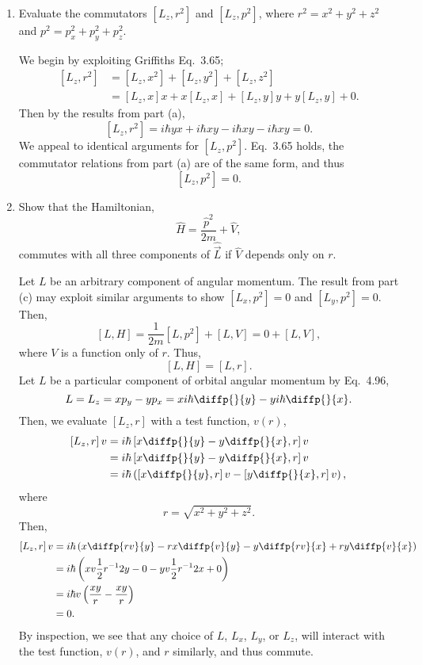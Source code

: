 \documentclass[a4paper, 12pt]{config/homework}
\begin{document}
\begin{enumerate}
\begin{enumerate}[label=(\alph*)]
\bigskip
\item Evaluate the commutators \([L_z, r^2]\) and \([L_z, p^2]\), where \(r^2 = x^2 + y^2 + z^2\) and \(p^2 = p^2_x + p^2_y + p^2_z\). \bigskip

We begin by exploiting Griffiths Eq.\ 3.65;
\begin{align*}
\left[L_z, r^2\right] &= \left[L_z, x^2\right] + \left[L_z, y^2\right] + \left[L_z, z^2\right]
\\&= \left[L_z, x\right]x + x\left[L_z, x\right] + \left[L_z, y\right]y + y\left[L_z, y\right] + 0.
\end{align*}
Then by the results from part (a),
\[\left[L_z, r^2\right] = i\hbar yx + i\hbar xy -i\hbar xy - i\hbar xy = 0.\]
We appeal to identical arguments for \(\left[L_z, p^2\right]\). Eq.\ 3.65 holds, the commutator relations from part (a) are of the same form, and thus
\[\left[L_z, p^2\right] = 0.\]

\bigskip
\item Show that the Hamiltonian, \[\hat{H}=\frac{\hat{p}^2}{2m} + \hat{V},\] commutes with all three components of \(\hat{\vec{L}}\) if \(\hat{V}\) depends only on \(r\). \bigskip

Let \(L\) be an arbitrary component of angular momentum. The result from part (c) may exploit similar arguments to show \(\left[L_x,p^2\right]=0\) and \(\left[L_y, p^2\right]=0\). Then,
\[\left[L, H\right] = \frac{1}{2m}\left[L, p^2\right] + \left[L, V\right] = 0 + \left[L, V\right],\]
where \(V\) is a function only of \(r\). Thus,
\[\left[L,H\right] = \left[L,r\right].\]
Let \(L\) be a particular component of orbital angular momentum by Eq.\ 4.96,
\[L=L_z=xp_y-yp_x=xi\hbar\diffp{}{y} - yi\hbar\diffp{}{x}.\]
Then, we evaluate \(\left[L_z,r\right]\) with a test function, \(v(r)\),
\begin{align*}
\left[L_z,r\right]v &= i\hbar\left[x\diffp{}{y}-y\diffp{}{x},r\right]v
\\&= i\hbar\left[x\diffp{}{y}-y\diffp{}{x},r\right]v
\\&= i\hbar\left(\left[x\diffp{}{y},r\right]v - \left[y\diffp{}{x},r\right]v\right),
\end{align*}
where
\[r = \sqrt{x^2 + y^2 + z^2}.\]
Then,
\begin{align*}
\left[L_z, r\right]v &= i\hbar\left(x\diffp{rv}{y}-rx\diffp{v}{y} - y\diffp{rv}{x} + ry\diffp{v}{x}\right)
\\&= i\hbar \left(xv\frac{1}{2}r^{-1}2y - 0 -yv\frac{1}{2}r^{-1}2x + 0\right)
\\&= i\hbar v\left(\frac{xy}{r}-\frac{xy}{r}\right)
\\&= 0.
\end{align*}
By inspection, we see that any choice of \(L\), \(L_x\), \(L_y\), or \(L_z\), will interact with the test function, \(v(r)\), and \(r\) similarly, and thus commute.

\end{enumerate}
\end{enumerate}
\end{document}
